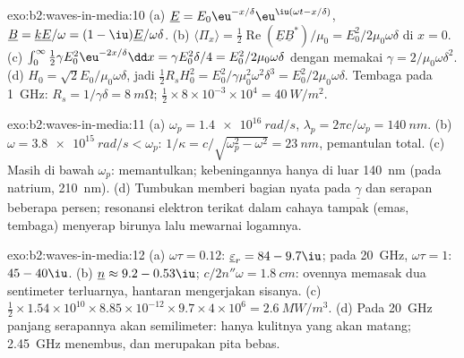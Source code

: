 \begin{solution}{exo:b2:waves-in-media:10}
(a) $\underline E = E_0\eu^{-x/\delta}\eu^{\iu(\omega t - x/\delta)}$, $\underline B = \underline k\underline E/\omega
= (1 - \iu)\underline E/\omega\delta$. (b) $\langle\Pi_x\rangle = \tfrac12\operatorname{Re}(\underline E
\underline B^*)/\mu_0 = E_0^2/2\mu_0\omega\delta$ di $x = 0$. (c) $\int_0^\infty\tfrac12\gamma E_0^2
\eu^{-2x/\delta}\dd x = \gamma E_0^2\delta/4 = E_0^2/2\mu_0\omega\delta$ dengan memakai $\gamma = 2/\mu_0\omega\delta^2$.
(d) $H_0 = \sqrt2E_0/\mu_0\omega\delta$, jadi $\tfrac12R_sH_0^2 = E_0^2/\gamma\mu_0^2\omega^2\delta^3 =
E_0^2/2\mu_0\omega\delta$. Tembaga pada \qty{1}{GHz}: $R_s = 1/\gamma\delta = \qty{8}{m\ohm}$;
$\tfrac12 \times 8 \times 10^{-3} \times 10^4 = \qty{40}{W/m^2}$.
\end{solution}

\begin{solution}{exo:b2:waves-in-media:11}
(a) $\omega_p = \qty{1.4e16}{rad/s}$, $\lambda_p = 2\pi c/\omega_p = \qty{140}{nm}$. (b) $\omega = \qty{3.8e15}{rad/s}
< \omega_p$: $1/\kappa = c/\sqrt{\omega_p^2 - \omega^2} = \qty{23}{nm}$, pemantulan total. (c)
Masih di bawah $\omega_p$: memantulkan; kebeningannya hanya di luar \qty{140}{nm} (pada
natrium, \qty{210}{nm}). (d) Tumbukan memberi bagian nyata pada $\underline\gamma$ dan
serapan beberapa persen; resonansi elektron terikat dalam cahaya tampak
(emas, tembaga) menyerap birunya lalu mewarnai logamnya.
\end{solution}

\begin{solution}{exo:b2:waves-in-media:12}
(a) $\omega\tau = 0.12$: $\underline\varepsilon_r = 84 - 9.7\iu$; pada \qty{20}{GHz}, $\omega\tau = 1$:
$45 - 40\iu$. (b) $\underline n \approx 9.2 - 0.53\iu$; $c/2n''\omega = \qty{1.8}{cm}$: ovennya
memasak dua sentimeter terluarnya, hantaran mengerjakan sisanya. (c) $\tfrac12 \times
1.54 \times 10^{10} \times 8.85 \times 10^{-12} \times 9.7 \times 4 \times 10^6 = \qty{2.6}{MW/m^3}$. (d) Pada
\qty{20}{GHz} panjang serapannya akan semilimeter: hanya kulitnya
yang akan matang; \qty{2.45}{GHz} menembus, dan merupakan pita bebas.
\end{solution}

